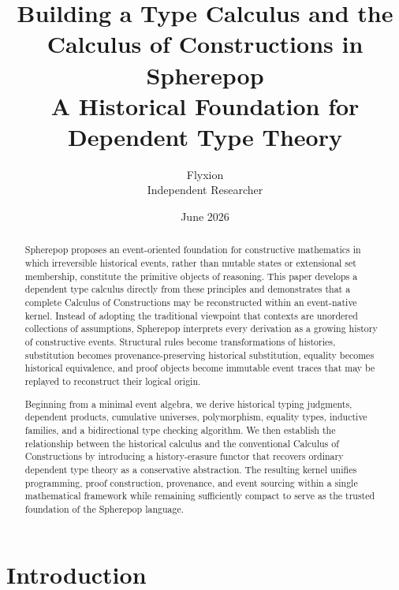 \documentclass[12pt,oneside]{article}
\title{
{\Large\bfseries Building a Type Calculus and the\\
Calculus of Constructions in Spherepop}\\
{\large
A Historical Foundation for Dependent Type Theory}
}
\author{Flyxion\\
Independent Researcher}
\date{June 2026}
\theoremstyle{definition}
\theoremstyle{remark}
\begin{document}
\maketitle

\thispagestyle{empty}

\vspace{1em}

\begin{abstract}

Spherepop proposes an event-oriented foundation for constructive mathematics in which irreversible historical events, rather than mutable states or extensional set membership, constitute the primitive objects of reasoning. This paper develops a dependent type calculus directly from these principles and demonstrates that a complete Calculus of Constructions may be reconstructed within an event-native kernel. Instead of adopting the traditional viewpoint that contexts are unordered collections of assumptions, Spherepop interprets every derivation as a growing history of constructive events. Structural rules become transformations of histories, substitution becomes provenance-preserving historical substitution, equality becomes historical equivalence, and proof objects become immutable event traces that may be replayed to reconstruct their logical origin.

Beginning from a minimal event algebra, we derive historical typing judgments, dependent products, cumulative universes, polymorphism, equality types, inductive families, and a bidirectional type checking algorithm. We then establish the relationship between the historical calculus and the conventional Calculus of Constructions by introducing a history-erasure functor that recovers ordinary dependent type theory as a conservative abstraction. The resulting kernel unifies programming, proof construction, provenance, and event sourcing within a single mathematical framework while remaining sufficiently compact to serve as the trusted foundation of the Spherepop language.

\end{abstract}

\newpage

\tableofcontents

\newpage

\section{Introduction}
\end{document}
